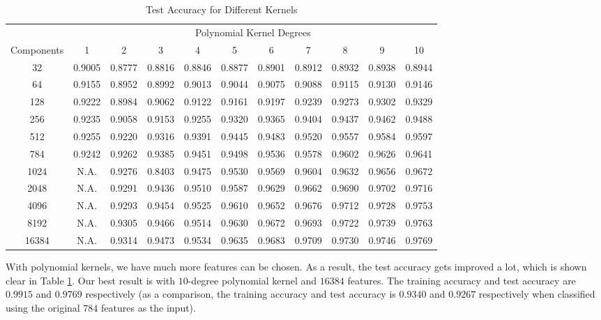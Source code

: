 \documentclass[tikz, multi,dvipsnames,svgnames,x11names]{article}
\begin{document}
\begin{table}[htb]
	\centering
	\caption{Test Accuracy for Different Kernels}
	\label{table:test_acc}	
	\begin{tabular}{c c c c c c c c c c c}
		\hline \hline
			   & \multicolumn{10}{c}{Polynomial Kernel Degrees} \\
		\cline{2-11}
    Components & 1 	 	& 2 	 &	3 	   & 4 		& 5 	 & 6 	  & 7 	   & 8 	    & 9 	 & 10 \\[0.1cm]
		\hline
		32	   & 0.9005 & 0.8777 &	0.8816 & 0.8846 & 0.8877 & 0.8901 & 0.8912 & 0.8932 & 0.8938 & 0.8944\\[0.1cm]
		64	   & 0.9155 & 0.8952 &	0.8992 & 0.9013 & 0.9044 & 0.9075 & 0.9088 & 0.9115 & 0.9130 & 0.9146\\[0.1cm]
		128	   & 0.9222 & 0.8984 &	0.9062 & 0.9122 & 0.9161 & 0.9197 & 0.9239 & 0.9273 & 0.9302 & 0.9329\\[0.1cm]
		256    & 0.9235 & 0.9058 &	0.9153 & 0.9255 & 0.9320 & 0.9365 & 0.9404 & 0.9437 & 0.9462 & 0.9488\\[0.1cm]
		512	   & 0.9255 & 0.9220 &	0.9316 & 0.9391 & 0.9445 & 0.9483 & 0.9520 & 0.9557 & 0.9584 & 0.9597\\[0.1cm]
		784	   & 0.9242 & 0.9262 &	0.9385 & 0.9451 & 0.9498 & 0.9536 & 0.9578 & 0.9602 & 0.9626 & 0.9641\\[0.1cm]
		1024   & N.A.	& 0.9276 &	0.8403 & 0.9475 & 0.9530 & 0.9569 & 0.9604 & 0.9632 & 0.9656 & 0.9672\\[0.1cm]
		2048   & N.A.	& 0.9291 &	0.9436 & 0.9510 & 0.9587 & 0.9629 & 0.9662 & 0.9690 & 0.9702 & 0.9716\\[0.1cm]
		4096   & N.A.	& 0.9293 &	0.9454 & 0.9525 & 0.9610 & 0.9652 & 0.9676 & 0.9712 & 0.9728 & 0.9753\\[0.1cm]
		8192   & N.A.	& 0.9305 &	0.9466 & 0.9514 & 0.9630 & 0.9672 & 0.9693 & 0.9722 & 0.9739 & 0.9763\\[0.1cm]
		16384  & N.A.	& 0.9314 &	0.9473 & 0.9534 & 0.9635 & 0.9683 & 0.9709 & 0.9730 & 0.9746 & 0.9769\\[0.1cm]
		\hline	
	\end{tabular}
\end{table}

With polynomial kernels, we have much more features can be chosen. As a result, the test accuracy gets improved a lot, which is shown clear in Table \ref{table:test_acc}. Our best result is with $10$-degree polynomial kernel and $16384$ features. The training accuracy and test accuracy are $0.9915$ and $0.9769$ respectively (as a comparison, the training accuracy and test accuracy is $0.9340$ and $0.9267$ respectively when classified using the original $784$ features as the input).
\end{document}
